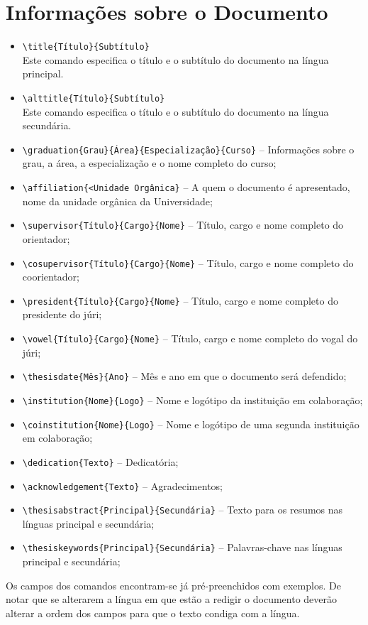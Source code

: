 \section{Informações sobre o Documento}
\label{sec:docinfo}
\begin{itemize}
    \item \texttt{\textbackslash title\{Título\}\{Subtítulo\}}\\
    Este comando especifica o título e o subtítulo do documento na língua principal.
    \item \texttt{\textbackslash alttitle\{Título\}\{Subtítulo\}}\\
    Este comando especifica o título e o subtítulo do documento na língua secundária.
    \item \texttt{\textbackslash graduation\{Grau\}\{Área\}\{Especialização\}\{Curso\}} -- Informações sobre o grau, a área, a especialização e o nome completo do curso;
    \item \texttt{\textbackslash affiliation\{<Unidade Orgânica\}} -- A quem o documento é apresentado, nome da unidade orgânica da Universidade;
    \item \texttt{\textbackslash supervisor\{Título\}\{Cargo\}\{Nome\}} -- Título, cargo e nome completo do orientador;
    \item \texttt{\textbackslash cosupervisor\{Título\}\{Cargo\}\{Nome\}} -- Título, cargo e nome completo do coorientador;
    \item \texttt{\textbackslash president\{Título\}\{Cargo\}\{Nome\}} -- Título, cargo e nome completo do presidente do júri;
    \item \texttt{\textbackslash vowel\{Título\}\{Cargo\}\{Nome\}} -- Título, cargo e nome completo do vogal do júri;
    \item \texttt{\textbackslash thesisdate\{Mês\}\{Ano\}} -- Mês e ano em que o documento será defendido;
    \item \texttt{\textbackslash institution\{Nome\}\{Logo\}} -- Nome e logótipo da instituição em colaboração;
    \item \texttt{\textbackslash coinstitution\{Nome\}\{Logo\}} -- Nome e logótipo de uma segunda instituição em colaboração;
    \item \texttt{\textbackslash dedication\{Texto\}} -- Dedicatória;
    \item \texttt{\textbackslash acknowledgement\{Texto\}} -- Agradecimentos;
    \item \texttt{\textbackslash thesisabstract\{Principal\}\{Secundária\}} -- Texto para os resumos nas línguas principal e secundária;
    \item \texttt{\textbackslash thesiskeywords\{Principal\}\{Secundária\}} -- Palavras-chave nas línguas principal e secundária;
\end{itemize}
Os campos dos comandos encontram-se já pré-preenchidos com exemplos. De notar que se alterarem a língua em que estão a redigir o documento deverão alterar a ordem dos campos para que o texto condiga com a língua.


